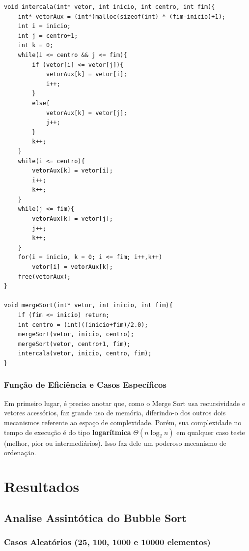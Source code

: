 \documentclass[a4paper, 12pt]{article}
\begin{document}
\begin{verbatim}
void intercala(int* vetor, int inicio, int centro, int fim){
    int* vetorAux = (int*)malloc(sizeof(int) * (fim-inicio)+1);
    int i = inicio;
    int j = centro+1;
    int k = 0;
    while(i <= centro && j <= fim){
        if (vetor[i] <= vetor[j]){ 
            vetorAux[k] = vetor[i];
            i++; 
        }
        else{
            vetorAux[k] = vetor[j];
            j++;
        }
        k++;
    }
    while(i <= centro){
        vetorAux[k] = vetor[i];
        i++;
        k++;
    }
    while(j <= fim){
        vetorAux[k] = vetor[j];
        j++;
        k++;
    }
    for(i = inicio, k = 0; i <= fim; i++,k++)
        vetor[i] = vetorAux[k];
    free(vetorAux);
}

void mergeSort(int* vetor, int inicio, int fim){
    if (fim <= inicio) return;
    int centro = (int)((inicio+fim)/2.0);
    mergeSort(vetor, inicio, centro);
    mergeSort(vetor, centro+1, fim);
    intercala(vetor, inicio, centro, fim);
}
\end{verbatim}

\subsubsection{Função de Eficiência e Casos Específicos}
\tab Em primeiro lugar, é preciso anotar que, como o Merge Sort usa recursividade e vetores acessórios, faz grande uso de memória, diferindo-o dos outros dois mecanismos referente ao espaço de complexidade. Porém, sua complexidade no tempo de execução é do tipo \textbf{logarítmica} $\varTheta (n\log_{2}n)$ em qualquer caso teste (melhor, pior ou intermediários). Isso faz dele um poderoso mecanismo de ordenação.

\vspace{0.4cm}
\section{Resultados}
\subsection{Analise Assintótica do Bubble Sort}

\subsubsection{Casos Aleatórios (25, 100, 1000 e 10000 elementos)}
\end{document}
